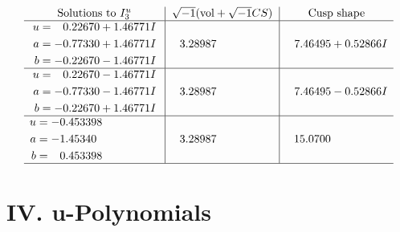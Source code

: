 \documentclass[1p]{elsarticle_modified}
\theoremstyle{definition}
\newcommand{\I}{\sqrt{-1}}
\begin{document}
$$\begin{array}{c|c|c}  
\text{Solutions to }I^u_{3}& \I (\text{vol} + \sqrt{-1}CS) & \text{Cusp shape}\\
 \hline 
\begin{aligned}
u &= \phantom{-}0.22670 + 1.46771 I \\
a &= -0.77330 + 1.46771 I \\
b &= -0.22670 - 1.46771 I\end{aligned}
 & \phantom{-}3.28987\phantom{ +0.000000I} & \phantom{-}7.46495 + 0.52866 I \\ \hline\begin{aligned}
u &= \phantom{-}0.22670 - 1.46771 I \\
a &= -0.77330 - 1.46771 I \\
b &= -0.22670 + 1.46771 I\end{aligned}
 & \phantom{-}3.28987\phantom{ +0.000000I} & \phantom{-}7.46495 - 0.52866 I \\ \hline\begin{aligned}
u &= -0.453398\phantom{ +0.000000I} \\
a &= -1.45340\phantom{ +0.000000I} \\
b &= \phantom{-}0.453398\phantom{ +0.000000I}\end{aligned}
 & \phantom{-}3.28987\phantom{ +0.000000I} & \phantom{-}15.0700\phantom{ +0.000000I}\\
 \hline 
 \end{array}$$\newpage
\newpage\renewcommand{\arraystretch}{1}
\centering \section*{ IV. u-Polynomials}
\end{document}
